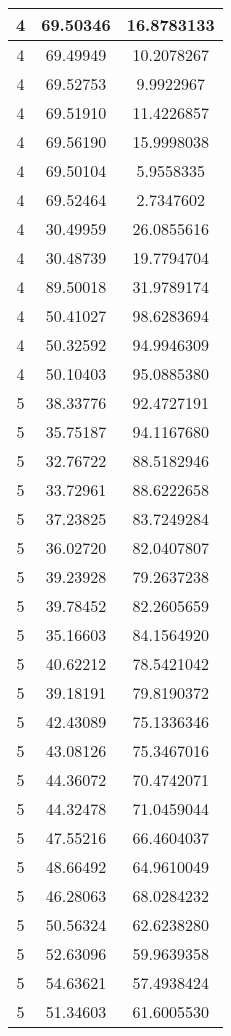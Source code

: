 \documentclass[
]{book}
\begin{document}
\begin{tabular}{c|c|c}
\hline
4 & 69.50346 & 16.8783133\\
\hline
4 & 69.49949 & 10.2078267\\
\hline
4 & 69.52753 & 9.9922967\\
\hline
4 & 69.51910 & 11.4226857\\
\hline
4 & 69.56190 & 15.9998038\\
\hline
4 & 69.50104 & 5.9558335\\
\hline
4 & 69.52464 & 2.7347602\\
\hline
4 & 30.49959 & 26.0855616\\
\hline
4 & 30.48739 & 19.7794704\\
\hline
4 & 89.50018 & 31.9789174\\
\hline
4 & 50.41027 & 98.6283694\\
\hline
4 & 50.32592 & 94.9946309\\
\hline
4 & 50.10403 & 95.0885380\\
\hline
5 & 38.33776 & 92.4727191\\
\hline
5 & 35.75187 & 94.1167680\\
\hline
5 & 32.76722 & 88.5182946\\
\hline
5 & 33.72961 & 88.6222658\\
\hline
5 & 37.23825 & 83.7249284\\
\hline
5 & 36.02720 & 82.0407807\\
\hline
5 & 39.23928 & 79.2637238\\
\hline
5 & 39.78452 & 82.2605659\\
\hline
5 & 35.16603 & 84.1564920\\
\hline
5 & 40.62212 & 78.5421042\\
\hline
5 & 39.18191 & 79.8190372\\
\hline
5 & 42.43089 & 75.1336346\\
\hline
5 & 43.08126 & 75.3467016\\
\hline
5 & 44.36072 & 70.4742071\\
\hline
5 & 44.32478 & 71.0459044\\
\hline
5 & 47.55216 & 66.4604037\\
\hline
5 & 48.66492 & 64.9610049\\
\hline
5 & 46.28063 & 68.0284232\\
\hline
5 & 50.56324 & 62.6238280\\
\hline
5 & 52.63096 & 59.9639358\\
\hline
5 & 54.63621 & 57.4938424\\
\hline
5 & 51.34603 & 61.6005530\\

\end{tabular}
\end{document}
